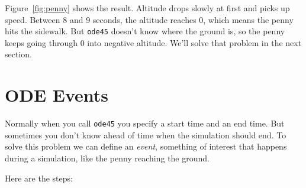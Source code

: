 Figure~\ref{fig:penny} shows the result.  Altitude drops slowly at first and picks up speed.  Between 8 and 9 seconds, the altitude reaches 0, which means the penny hits the sidewalk.  But \lstinline{ode45} doesn't know where the ground is, so \linebreak the penny keeps going through 0 into negative altitude.  We'll solve that problem in the next section.

\section{ODE Events}
\label{events}


Normally when you call \lstinline{ode45} you specify a start time and
an end time.  But sometimes you don't know ahead of time when the
simulation should end.  To solve this problem we can define an \emph{event}, 
something of interest that happens during a simulation,
like the penny reaching the ground.

Here are the steps: 


